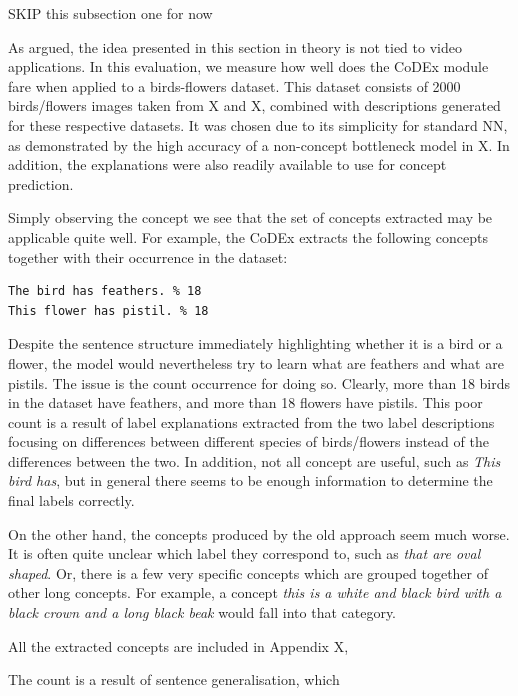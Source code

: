 SKIP this subsection one for now

As argued, the idea presented in this section in theory is not tied to video applications.
In this evaluation, we measure how well does the CoDEx module fare when applied to a birds-flowers dataset.
This dataset consists of 2000 birds/flowers images taken from X and X, combined with descriptions generated for these respective datasets.
It was chosen due to its simplicity for standard NN, as demonstrated by the high accuracy of a non-concept bottleneck model in X.
In addition, the explanations were also readily available to use for concept prediction.

Simply observing the concept we see that the set of concepts extracted may be applicable quite well.
For example, the CoDEx extracts the following concepts together with their occurrence in the dataset:
\begin{verbatim}
The bird has feathers. % 18
This flower has pistil. % 18
\end{verbatim}
Despite the sentence structure immediately highlighting whether it is a bird or a flower, the model would nevertheless try to learn what are feathers and what are pistils.
The issue is the count occurrence for doing so.
Clearly, more than 18 birds in the dataset have feathers, and more than 18 flowers have pistils.
This poor count is a result of label explanations extracted from the two label descriptions focusing on differences between different species of birds/flowers instead of the differences between the two.
In addition, not all concept are useful, such as \emph{This bird has}, but in general there seems to be enough information to determine the final labels correctly.

On the other hand, the concepts produced by the old approach seem much worse. 
It is often quite unclear which label they correspond to, such as \emph{that are oval shaped}.
Or, there is a few very specific concepts which are grouped together of other long concepts.
For example, a concept \emph{this is a white and black bird with a black crown and a long black beak} would fall into that category.

All the extracted concepts are included in Appendix X, 

The count is a result of sentence generalisation, which 



